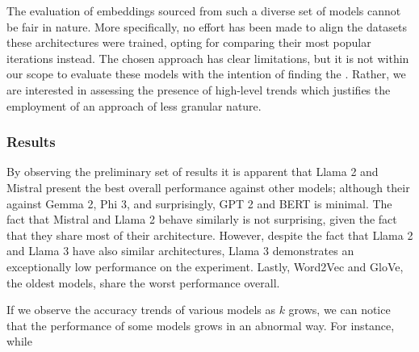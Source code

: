 
The evaluation of embeddings sourced from such a diverse set of models cannot be fair in nature.
More specifically, no effort has been made to align the datasets  these architectures were trained, opting for comparing their most popular iterations instead.
The chosen approach has clear limitations, but it is not within our scope to evaluate these models with the intention of finding the .
Rather, we are interested in assessing the presence of high-level trends which justifies the employment of an approach of less granular nature.

\subsubsection{Results}


By observing the preliminary set of results it is apparent that Llama 2 and Mistral present the best overall performance against other models; although their  against Gemma 2, Phi 3, and surprisingly, GPT 2 and BERT is minimal.
The fact that Mistral and Llama 2 behave similarly is not surprising, given the fact that they share most of their architecture.
However, despite the fact that Llama 2 and Llama 3 have also similar architectures, Llama 3 demonstrates an exceptionally low performance on the experiment.
Lastly, Word2Vec and GloVe, the oldest models, share the worst performance overall.

If we observe the accuracy trends of various models as $k$ grows, we can notice that the performance of some models grows in an abnormal way.
For instance, while




